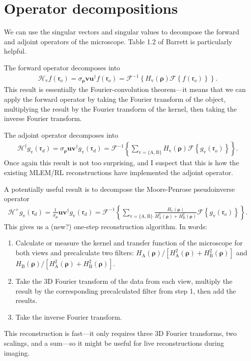 \documentclass[11pt]{article}
\providecommand{\mb}[1]{\mathbf{#1}}
\providecommand{\mc}[1]{\mathcal{#1}}
\providecommand{\ro}[1]{\mathbf{\mathfrak{r}}_o}
\providecommand{\rd}[1]{\mathbf{\mathfrak{r}}_d}
\providecommand{\bs}[1]{\boldsymbol{#1}}
\begin{document}
\section{Operator decompositions}
We can use the singular vectors and singular values to decompose the forward and
adjoint operators of the microscope. Table 1.2 of Barrett is particularly
helpful.

The forward operator decomposes into
\begin{align}
  \mc{H}_{\text{v}}f(\ro{}) = \sigma_{\bs{\rho}}\mb{v}\mb{u}^{\dagger}f(\ro{}) = \mc{F}^{-1}\left\{H_{\text{v}}(\bs{\rho})\mc{F}\left\{f(\ro{})\right\}\right\}. 
\end{align}
This result is essentially the Fourier-convolution theorem---it means that we
can apply the forward operator by taking the Fourier transform of the object,
multiplying the result by the Fourier transform of the kernel, then taking the
inverse Fourier transform.

The adjoint operator decomposes into 
\begin{align}
  \mc{H}^{\dagger}g_\text{v}(\rd{}) = \sigma_{\bs{\rho}}\mb{u}\mb{v}^{\dagger}g_\text{v}(\rd{}) = \mc{F}^{-1}\left\{\sum_{\text{v} = \{\text{A}, \text{B}\}}H_{\text{v}}(\bs{\rho})\mc{F}\left\{g_{\text{v}}(\ro{})\right\}\right\}. 
\end{align}
Once again this result is not too surprising, and I suspect that this is how the
existing MLEM/RL reconstructions have implemented the adjoint operator.

A potentially useful result is to decompose the Moore-Penrose pseudoinverse
operator
\begin{align}
  \mc{H}^+g_{\text{v}}(\rd{}) = \frac{1}{\sigma_{\bs{\rho}}}\mb{u}\mb{v}^{\dagger}g_{\text{v}}(\rd{}) = \mc{F}^{-1}\left\{\sum_{\text{v} = \{\text{A}, \text{B}\}}\frac{H_{\text{v}}(\bs{\rho})}{H_{\text{A}}^2(\bs{\rho}) + H_{\text{B}}^2(\bs{\rho})}\mc{F}\left\{g_{\text{v}}(\ro{})\right\}\right\}. \label{eq:mp}
\end{align}
This gives us a (new?) one-step reconstruction algorithm. In words:
\begin{enumerate}
\item Calculate or measure the kernel and transfer function of the microscope
  for both views and precalculate two filters:
  $H_{\text{A}}(\bs{\rho})/[H^2_{\text{A}}(\bs{\rho}) + H^2_{\text{B}}(\bs{\rho})]$ and $H_{\text{B}}(\bs{\rho})/[H^2_{\text{A}}(\bs{\rho}) + H^2_{\text{B}}(\bs{\rho})]$.
\item Take the 3D Fourier transform of the data from each view, multiply the
  result by the corresponding precalculated filter from step 1, then add the
  results.
\item Take the inverse Fourier transform. 
\end{enumerate}
This reconstruction is fast---it only requires three 3D Fourier transforms, two
scalings, and a sum---so it might be useful for live reconstructions during
imaging.
\end{document}
